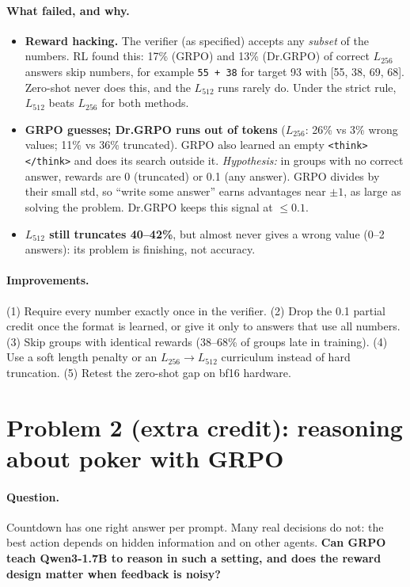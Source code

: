 \documentclass[10.5pt]{article}
\newcommand{\code}[1]{\texttt{#1}}
\begin{document}
\paragraph{What failed, and why.}
\begin{itemize}
\item \textbf{Reward hacking.} The verifier (as specified) accepts any \emph{subset} of the numbers. RL found this: 17\%
  (GRPO) and 13\% (Dr.GRPO) of correct $L_{256}$ answers skip numbers, for example \code{55 + 38} for target 93 with
  [55, 38, 69, 68]. Zero-shot never does this, and the $L_{512}$ runs rarely do. Under the strict rule, $L_{512}$ beats
  $L_{256}$ for both methods.
\item \textbf{GRPO guesses; Dr.GRPO runs out of tokens} ($L_{256}$: 26\% vs 3\% wrong values; 11\% vs 36\% truncated).
  GRPO also learned an empty \code{<think></think>} and does its search outside it. \emph{Hypothesis:} in groups with no
  correct answer, rewards are 0 (truncated) or 0.1 (any answer). GRPO divides by their small std, so ``write some answer''
  earns advantages near $\pm1$, as large as solving the problem. Dr.GRPO keeps this signal at $\le0.1$.
\item \textbf{$L_{512}$ still truncates 40--42\%}, but almost never gives a wrong value (0--2 answers): its problem is
  finishing, not accuracy.
\end{itemize}

\paragraph{Improvements.} (1) Require every number exactly once in the verifier. (2) Drop the 0.1 partial credit once the
format is learned, or give it only to answers that use all numbers. (3) Skip groups with identical rewards (38--68\% of
groups late in training). (4) Use a soft length penalty or an $L_{256}\to L_{512}$ curriculum instead of hard truncation.
(5) Retest the zero-shot gap on bf16 hardware.

\section{Problem 2 (extra credit): reasoning about poker with GRPO}
\paragraph{Question.} Countdown has one right answer per prompt. Many real decisions do not: the best action depends on
hidden information and on other agents. \textbf{Can GRPO teach Qwen3-1.7B to reason in such a setting, and does the reward
design matter when feedback is noisy?}
\end{document}
